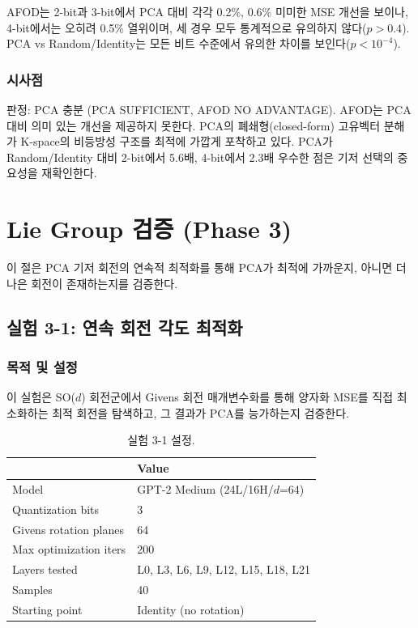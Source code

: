 \documentclass[11pt,a4paper]{article}
\begin{document}
AFOD는 2-bit과 3-bit에서 PCA 대비 각각 0.2\%, 0.6\% 미미한 MSE 개선을 보이나, 4-bit에서는 오히려 0.5\% 열위이며, 세 경우 모두 통계적으로 유의하지 않다($p > 0.4$).
PCA vs Random/Identity는 모든 비트 수준에서 유의한 차이를 보인다($p < 10^{-4}$).

\subsubsection{시사점}

판정: \textcolor{success}{PCA 충분 (PCA SUFFICIENT, AFOD NO ADVANTAGE)}.
AFOD는 PCA 대비 의미 있는 개선을 제공하지 못한다.
PCA의 폐쇄형(closed-form) 고유벡터 분해가 K-space의 비등방성 구조를 최적에 가깝게 포착하고 있다.
PCA가 Random/Identity 대비 2-bit에서 5.6배, 4-bit에서 2.3배 우수한 점은 기저 선택의 중요성을 재확인한다.

\newpage
\section{Lie Group 검증 (Phase 3)}

이 절은 PCA 기저 회전의 연속적 최적화를 통해 PCA가 최적에 가까운지, 아니면 더 나은 회전이 존재하는지를 검증한다.

\subsection{실험 3-1: 연속 회전 각도 최적화}

\subsubsection{목적 및 설정}

이 실험은 SO($d$) 회전군에서 Givens 회전 매개변수화를 통해 양자화 MSE를 직접 최소화하는 최적 회전을 탐색하고, 그 결과가 PCA를 능가하는지 검증한다.

\begin{table}[H]
\centering
\caption{실험 3-1 설정.}
\label{tab:exp31_setup}
\begin{tabular}{ll}
\toprule
\textbf{} & \textbf{Value} \\
\midrule
Model & GPT-2 Medium (24L/16H/$d$=64) \\
Quantization bits & 3 \\
Givens rotation planes & 64 \\
Max optimization iters & 200 \\
Layers tested & L0, L3, L6, L9, L12, L15, L18, L21 \\
Samples & 40 \\
Starting point & Identity (no rotation) \\
\bottomrule
\end{tabular}
\end{table}
\end{document}
